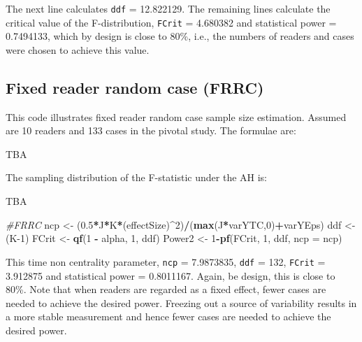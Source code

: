 \documentclass[
]{book}
\newenvironment{Shaded}{\begin{snugshade}}{\end{snugshade}}
\newcommand{\CommentTok}[1]{\textcolor[rgb]{0.56,0.35,0.01}{\textit{#1}}}
\newcommand{\DataTypeTok}[1]{\textcolor[rgb]{0.13,0.29,0.53}{#1}}
\newcommand{\DecValTok}[1]{\textcolor[rgb]{0.00,0.00,0.81}{#1}}
\newcommand{\FloatTok}[1]{\textcolor[rgb]{0.00,0.00,0.81}{#1}}
\newcommand{\KeywordTok}[1]{\textcolor[rgb]{0.13,0.29,0.53}{\textbf{#1}}}
\newcommand{\NormalTok}[1]{#1}
\newcommand{\OperatorTok}[1]{\textcolor[rgb]{0.81,0.36,0.00}{\textbf{#1}}}
\newcommand{\StringTok}[1]{\textcolor[rgb]{0.31,0.60,0.02}{#1}}
\begin{document}
The next line calculates \texttt{ddf} = 12.822129. The remaining lines calculate the critical value of the F-distribution, \texttt{FCrit} = 4.680382 and statistical power = 0.7494133, which by design is close to 80\%, i.e., the numbers of readers and cases were chosen to achieve this value.

\hypertarget{fixed-reader-random-case-frrc}{%
\subsection{Fixed reader random case (FRRC)}\label{fixed-reader-random-case-frrc}}

This code illustrates fixed reader random case sample size estimation. Assumed are 10 readers and 133 cases in the pivotal study. The formulae are:

TBA

The sampling distribution of the F-statistic under the AH is:

TBA

\begin{Shaded}
\begin{Highlighting}[]
\CommentTok{\#FRRC}
\NormalTok{ncp \textless{}{-}}\StringTok{ }\NormalTok{(}\FloatTok{0.5}\OperatorTok{*}\NormalTok{J}\OperatorTok{*}\NormalTok{K}\OperatorTok{*}\NormalTok{(effectSize)}\OperatorTok{\^{}}\DecValTok{2}\NormalTok{)}\OperatorTok{/}\NormalTok{(}\KeywordTok{max}\NormalTok{(J}\OperatorTok{*}\NormalTok{varYTC,}\DecValTok{0}\NormalTok{)}\OperatorTok{+}\NormalTok{varYEps)}
\NormalTok{ddf \textless{}{-}}\StringTok{ }\NormalTok{(K}\DecValTok{{-}1}\NormalTok{)}
\NormalTok{FCrit \textless{}{-}}\StringTok{ }\KeywordTok{qf}\NormalTok{(}\DecValTok{1} \OperatorTok{{-}}\StringTok{ }\NormalTok{alpha, }\DecValTok{1}\NormalTok{, ddf)}
\NormalTok{Power2 \textless{}{-}}\StringTok{ }\DecValTok{1}\OperatorTok{{-}}\KeywordTok{pf}\NormalTok{(FCrit, }\DecValTok{1}\NormalTok{, ddf, }\DataTypeTok{ncp =}\NormalTok{ ncp)}
\end{Highlighting}
\end{Shaded}

This time non centrality parameter, \texttt{ncp} = 7.9873835, \texttt{ddf} = 132, \texttt{FCrit} = 3.912875 and statistical power = 0.8011167. Again, be design, this is close to 80\%. Note that when readers are regarded as a fixed effect, fewer cases are needed to achieve the desired power. Freezing out a source of variability results in a more stable measurement and hence fewer cases are needed to achieve the desired power.
\end{document}
